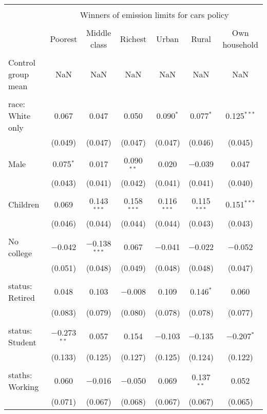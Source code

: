 
\begin{tabular}{@{\extracolsep{5pt}}lcccccc} 
\\[-1.8ex]\hline 
\hline \\[-1.8ex] 
 & \multicolumn{6}{c}{Winners of emission limits for cars policy} \\ 
\cline{2-7} 
\\[-1.8ex] & Poorest & Middle class & Richest & Urban & Rural & Own household \\ 
\hline \\[-1.8ex] 
 Control group mean & NaN & NaN & NaN & NaN & NaN & NaN  \\ \hline \\[-1.8ex] race: White only & 0.067 & 0.047 & 0.050 & 0.090$^{*}$ & 0.077$^{*}$ & 0.125$^{***}$ \\ 
  & (0.049) & (0.047) & (0.047) & (0.047) & (0.046) & (0.045) \\ 
  & & & & & & \\ 
 Male & 0.075$^{*}$ & 0.017 & 0.090$^{**}$ & 0.020 & $-$0.039 & 0.047 \\ 
  & (0.043) & (0.041) & (0.042) & (0.041) & (0.041) & (0.040) \\ 
  & & & & & & \\ 
 Children & 0.069 & 0.143$^{***}$ & 0.158$^{***}$ & 0.116$^{***}$ & 0.115$^{***}$ & 0.151$^{***}$ \\ 
  & (0.046) & (0.044) & (0.044) & (0.044) & (0.043) & (0.043) \\ 
  & & & & & & \\ 
 No college & $-$0.042 & $-$0.138$^{***}$ & 0.067 & $-$0.041 & $-$0.022 & $-$0.052 \\ 
  & (0.051) & (0.048) & (0.049) & (0.048) & (0.048) & (0.047) \\ 
  & & & & & & \\ 
 status: Retired & 0.048 & 0.103 & $-$0.008 & 0.109 & 0.146$^{*}$ & 0.060 \\ 
  & (0.083) & (0.079) & (0.080) & (0.078) & (0.078) & (0.077) \\ 
  & & & & & & \\ 
 status: Student & $-$0.273$^{**}$ & 0.057 & 0.154 & $-$0.103 & $-$0.135 & $-$0.207$^{*}$ \\ 
  & (0.133) & (0.125) & (0.127) & (0.125) & (0.124) & (0.122) \\ 
  & & & & & & \\ 
 staths: Working & 0.060 & $-$0.016 & $-$0.050 & 0.069 & 0.137$^{**}$ & 0.052 \\ 
  & (0.071) & (0.067) & (0.068) & (0.067) & (0.067) & (0.065) \\ 

\end{tabular}
